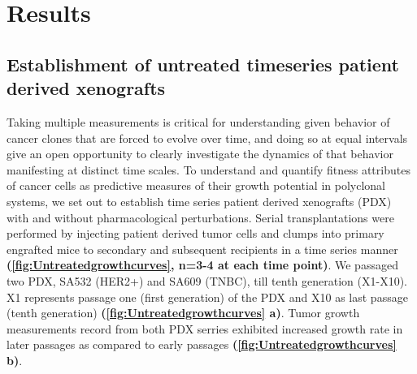 \section{Results}

 
\subsection{Establishment of untreated timeseries patient derived xenografts}
Taking multiple measurements is critical for understanding  given behavior of cancer clones that are forced to evolve over time, and doing so at equal intervals give an open opportunity to clearly investigate the dynamics of that behavior manifesting at distinct time scales. 
To understand and quantify fitness attributes of cancer cells as  predictive measures of their growth potential in polyclonal systems, we set out to establish time series patient derived xenografts (PDX) with and without pharmacological perturbations.
Serial transplantations were performed by injecting patient derived tumor cells and clumps into primary engrafted mice to secondary and subsequent recipients in a time series manner \textbf{(\autoref{fig:Untreatedgrowthcurves}, n=3-4 at each time point)}. We passaged two PDX, SA532 (HER2+) and SA609 (TNBC), till tenth generation (X1-X10). X1 represents passage one (first generation) of the PDX and X10 as last passage (tenth generation)   \textbf{(\autoref{fig:Untreatedgrowthcurves} a)}. 
Tumor growth measurements record from both PDX serries exhibited increased growth rate in later passages as compared to early passages \textbf{(\autoref{fig:Untreatedgrowthcurves} b)}.
 
